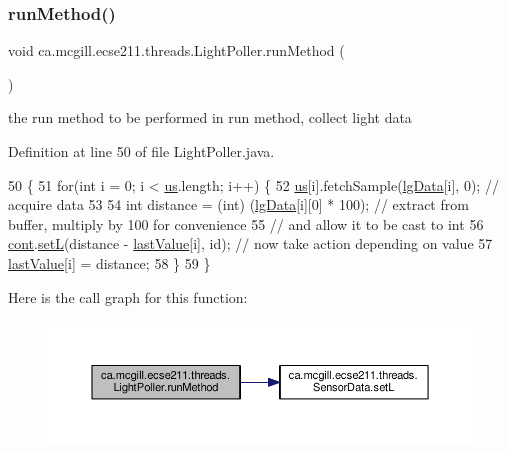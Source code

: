 \subsubsection{\texorpdfstring{run\+Method()}{runMethod()}}
{\footnotesize\ttfamily void ca.\+mcgill.\+ecse211.\+threads.\+Light\+Poller.\+run\+Method (\begin{DoxyParamCaption}{ }\end{DoxyParamCaption})\hspace{0.3cm}{\ttfamily [protected]}}

the run method to be performed in run method, collect light data 

Definition at line 50 of file Light\+Poller.\+java.


\begin{DoxyCode}
50                              \{
51     \textcolor{keywordflow}{for}(\textcolor{keywordtype}{int} i = 0; i < \hyperlink{classca_1_1mcgill_1_1ecse211_1_1threads_1_1_light_poller_ab6a9cb770bbf71f586697633db1475ff}{us}.length; i++) \{
52       \hyperlink{classca_1_1mcgill_1_1ecse211_1_1threads_1_1_light_poller_ab6a9cb770bbf71f586697633db1475ff}{us}[i].fetchSample(\hyperlink{classca_1_1mcgill_1_1ecse211_1_1threads_1_1_light_poller_a6cf53aecc3efc481f71d36341d2276c6}{lgData}[i], 0); \textcolor{comment}{// acquire data}
53   
54       \textcolor{keywordtype}{int} distance = (int) (\hyperlink{classca_1_1mcgill_1_1ecse211_1_1threads_1_1_light_poller_a6cf53aecc3efc481f71d36341d2276c6}{lgData}[i][0] * 100); \textcolor{comment}{// extract from buffer, multiply by 100 for
       convenience}
55                                               \textcolor{comment}{// and allow it to be cast to int}
56       \hyperlink{classca_1_1mcgill_1_1ecse211_1_1threads_1_1_light_poller_ab6a9050ced4f6940add4735c8872194a}{cont}.\hyperlink{classca_1_1mcgill_1_1ecse211_1_1threads_1_1_sensor_data_a1c2c38354fc5a66b4667e1d47ab6b20b}{setL}(distance - \hyperlink{classca_1_1mcgill_1_1ecse211_1_1threads_1_1_light_poller_a79908bf56395ae82ab5ac57b5b40f206}{lastValue}[i], \textcolor{keywordtype}{id}); \textcolor{comment}{// now take action depending on value}
57       \hyperlink{classca_1_1mcgill_1_1ecse211_1_1threads_1_1_light_poller_a79908bf56395ae82ab5ac57b5b40f206}{lastValue}[i] = distance; 
58     \}
59   \}
\end{DoxyCode}
Here is the call graph for this function\+:\nopagebreak
\begin{figure}[H]
\begin{center}
\leavevmode
\includegraphics[width=350pt]{classca_1_1mcgill_1_1ecse211_1_1threads_1_1_light_poller_aab90a460a4d0c926fb8f3930492a8fb1_cgraph}
\end{center}
\end{figure}


